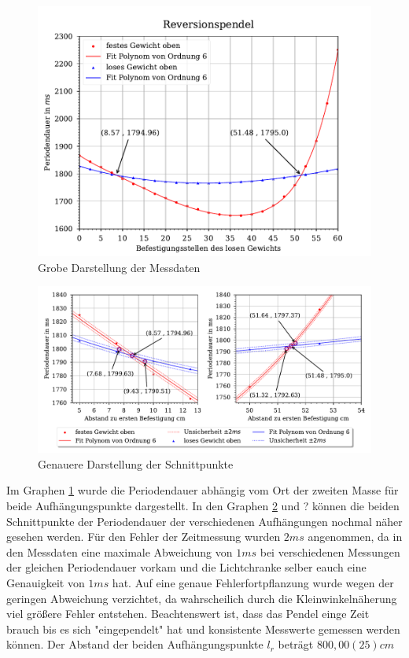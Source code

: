 \documentclass[11pt, a4paper]{article}
\begin{document}
    \begin{figure}[ht]
        \centering
        \includegraphics[width=120mm]{./Reversion_grob.pdf}

        \caption{Grobe Darstellung der Messdaten}
        \label{fig:revgrob}
    \end{figure}
    \begin{figure}[ht]
        \centering
        \includegraphics[width=120mm]{./Reversion_fein.pdf}

        \caption{Genauere Darstellung der Schnittpunkte}
        \label{fig:revfein1}
    \end{figure}

    Im Graphen \ref{fig:revgrob} wurde die Periodendauer abhängig vom Ort der zweiten Masse für beide Aufhängungspunkte dargestellt. 
    In den Graphen \ref{fig:revfein1} und ? können die beiden Schnittpunkte der Periodendauer der verschiedenen
    Aufhängungen nochmal näher gesehen werden. Für den Fehler der Zeitmessung
    wurden $2ms$ angenommen, da in den Messdaten eine maximale Abweichung von $1ms$ bei verschiedenen Messungen 
    der gleichen Periodendauer vorkam und die Lichtchranke selber eauch eine Genauigkeit von $1ms$ hat.
    Auf eine genaue Fehlerfortpflanzung wurde wegen der geringen Abweichung verzichtet, da wahrscheilich
    durch die Kleinwinkelnäherung viel größere Fehler entstehen.
    Beachtenswert ist, dass das Pendel einge Zeit brauch bis es sich "eingependelt" hat und konsistente Messwerte
    gemessen werden können. Der Abstand der beiden Aufhängungspunkte $l_r$ beträgt $800,00(25)cm$
\end{document}
